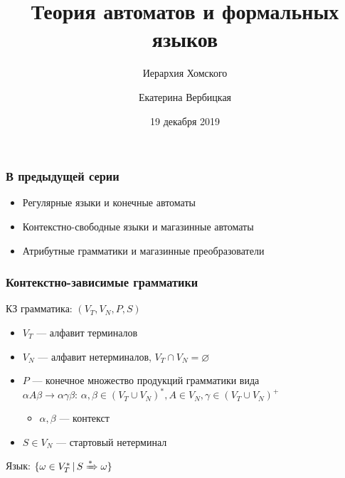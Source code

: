 \documentclass{beamer}
\title[]{Теория автоматов и формальных языков}
\subtitle[]{Иерархия Хомского}
\institute[]{
Санкт-Петербургский государственный электротехнический университет <<ЛЭТИ>>\\
}
\author[]{Екатерина Вербицкая}
\date{19 декабря 2019}
\newcommand{\derive}[0]{\xRightarrow[]{*}}
\begin{document}
{
  \begin{frame}
    \titlepage
  \end{frame}
}

\begin{frame}[fragile]
  \transwipe[direction=90]
  \frametitle{В предыдущей серии}
  \begin{itemize}
    \item Регулярные языки и конечные автоматы
    \item Контекстно-свободные языки и магазинные автоматы
    \item Атрибутные грамматики и магазинные преобразователи
  \end{itemize}
\end{frame}

\begin{frame}[fragile]
  \transwipe[direction=90]
  \frametitle{Контекстно-зависимые грамматики}

  \begin{center}
    КЗ грамматика: $(V_T, V_N, P, S)$
  \end{center}
  
  \begin{itemize}
    \item $V_T$ --- алфавит терминалов
    \item $V_N$ --- алфавит нетерминалов, $V_T \cap V_N = \varnothing$
    \item $P$ --- конечное множество продукций грамматики вида $\alpha A \beta \rightarrow \alpha \gamma \beta: \, \alpha, \beta \in (V_T \cup V_N)^*, A \in V_N, \gamma \in (V_T \cup V_N)^+$
    \begin{itemize}
      \item $\alpha, \beta$ --- контекст
    \end{itemize}    
    \item $S \in V_N$ --- стартовый нетерминал
  \end{itemize} 
  

  \begin{center}
    Язык: $\{ \omega \in V_T^* \, | \, S \derive \omega\}$ 
  \end{center}
\end{frame}
\end{document}
